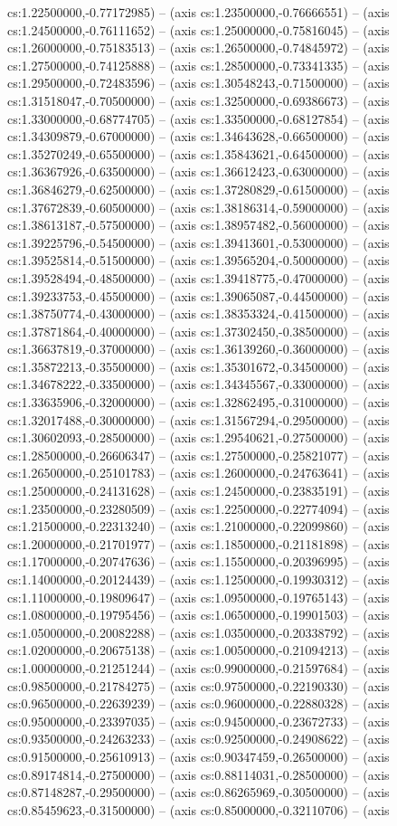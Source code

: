 cs:1.22500000,-0.77172985) -- (axis cs:1.23500000,-0.76666551) -- (axis cs:1.24500000,-0.76111652) -- (axis cs:1.25000000,-0.75816045) -- (axis cs:1.26000000,-0.75183513) -- (axis cs:1.26500000,-0.74845972) -- (axis cs:1.27500000,-0.74125888) -- (axis cs:1.28500000,-0.73341335) -- (axis cs:1.29500000,-0.72483596) -- (axis cs:1.30548243,-0.71500000) -- (axis cs:1.31518047,-0.70500000) -- (axis cs:1.32500000,-0.69386673) -- (axis cs:1.33000000,-0.68774705) -- (axis cs:1.33500000,-0.68127854) -- (axis cs:1.34309879,-0.67000000) -- (axis cs:1.34643628,-0.66500000) -- (axis cs:1.35270249,-0.65500000) -- (axis cs:1.35843621,-0.64500000) -- (axis cs:1.36367926,-0.63500000) -- (axis cs:1.36612423,-0.63000000) -- (axis cs:1.36846279,-0.62500000) -- (axis cs:1.37280829,-0.61500000) -- (axis cs:1.37672839,-0.60500000) -- (axis cs:1.38186314,-0.59000000) -- (axis cs:1.38613187,-0.57500000) -- (axis cs:1.38957482,-0.56000000) -- (axis cs:1.39225796,-0.54500000) -- (axis cs:1.39413601,-0.53000000) -- (axis cs:1.39525814,-0.51500000) -- (axis cs:1.39565204,-0.50000000) -- (axis cs:1.39528494,-0.48500000) -- (axis cs:1.39418775,-0.47000000) -- (axis cs:1.39233753,-0.45500000) -- (axis cs:1.39065087,-0.44500000) -- (axis cs:1.38750774,-0.43000000) -- (axis cs:1.38353324,-0.41500000) -- (axis cs:1.37871864,-0.40000000) -- (axis cs:1.37302450,-0.38500000) -- (axis cs:1.36637819,-0.37000000) -- (axis cs:1.36139260,-0.36000000) -- (axis cs:1.35872213,-0.35500000) -- (axis cs:1.35301672,-0.34500000) -- (axis cs:1.34678222,-0.33500000) -- (axis cs:1.34345567,-0.33000000) -- (axis cs:1.33635906,-0.32000000) -- (axis cs:1.32862495,-0.31000000) -- (axis cs:1.32017488,-0.30000000) -- (axis cs:1.31567294,-0.29500000) -- (axis cs:1.30602093,-0.28500000) -- (axis cs:1.29540621,-0.27500000) -- (axis cs:1.28500000,-0.26606347) -- (axis cs:1.27500000,-0.25821077) -- (axis cs:1.26500000,-0.25101783) -- (axis cs:1.26000000,-0.24763641) -- (axis cs:1.25000000,-0.24131628) -- (axis cs:1.24500000,-0.23835191) -- (axis cs:1.23500000,-0.23280509) -- (axis cs:1.22500000,-0.22774094) -- (axis cs:1.21500000,-0.22313240) -- (axis cs:1.21000000,-0.22099860) -- (axis cs:1.20000000,-0.21701977) -- (axis cs:1.18500000,-0.21181898) -- (axis cs:1.17000000,-0.20747636) -- (axis cs:1.15500000,-0.20396995) -- (axis cs:1.14000000,-0.20124439) -- (axis cs:1.12500000,-0.19930312) -- (axis cs:1.11000000,-0.19809647) -- (axis cs:1.09500000,-0.19765143) -- (axis cs:1.08000000,-0.19795456) -- (axis cs:1.06500000,-0.19901503) -- (axis cs:1.05000000,-0.20082288) -- (axis cs:1.03500000,-0.20338792) -- (axis cs:1.02000000,-0.20675138) -- (axis cs:1.00500000,-0.21094213) -- (axis cs:1.00000000,-0.21251244) -- (axis cs:0.99000000,-0.21597684) -- (axis cs:0.98500000,-0.21784275) -- (axis cs:0.97500000,-0.22190330) -- (axis cs:0.96500000,-0.22639239) -- (axis cs:0.96000000,-0.22880328) -- (axis cs:0.95000000,-0.23397035) -- (axis cs:0.94500000,-0.23672733) -- (axis cs:0.93500000,-0.24263233) -- (axis cs:0.92500000,-0.24908622) -- (axis cs:0.91500000,-0.25610913) -- (axis cs:0.90347459,-0.26500000) -- (axis cs:0.89174814,-0.27500000) -- (axis cs:0.88114031,-0.28500000) -- (axis cs:0.87148287,-0.29500000) -- (axis cs:0.86265969,-0.30500000) -- (axis cs:0.85459623,-0.31500000) -- (axis cs:0.85000000,-0.32110706) -- (axis 